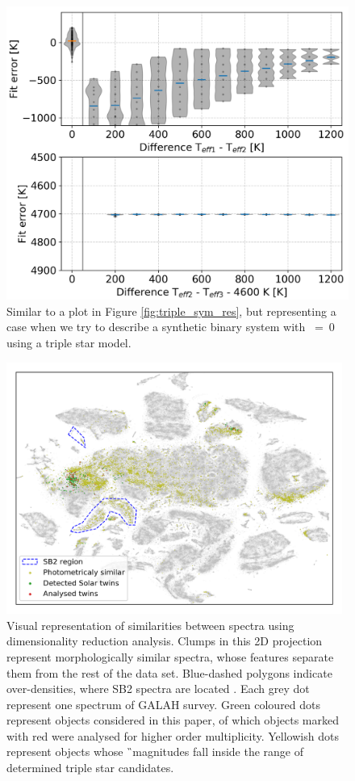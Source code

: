 \begin{figure}
	\centering
	\includegraphics[width=\columnwidth]{two_stars_fit_sim_res.png}
	\caption{Similar to a plot in Figure \ref{fig:triple_sym_res}, but representing a case when we try to describe a synthetic binary system with ~=~$0$ using a triple star model.}
	\label{fig:binary_sym_res}
\end{figure}

\begin{figure}
	\centering
	\includegraphics[width=0.98\textwidth]{evaluated_all_tsne.png}
	\caption{Visual representation of similarities between spectra using dimensionality reduction analysis. Clumps in this 2D projection represent morphologically similar spectra, whose features separate them from the rest of the data set. Blue-dashed polygons indicate over-densities, where SB2 spectra are located \citep[projection and regions are taken from Figure 13 in][]{buder2018}. Each grey dot represent one spectrum of GALAH survey. Green coloured dots represent objects considered in this paper, of which objects marked with red were analysed for higher order multiplicity. Yellowish dots represent objects whose \G\ magnitudes fall inside the range of determined triple star candidates.}
	\label{fig:tsne_marked}
\end{figure}
